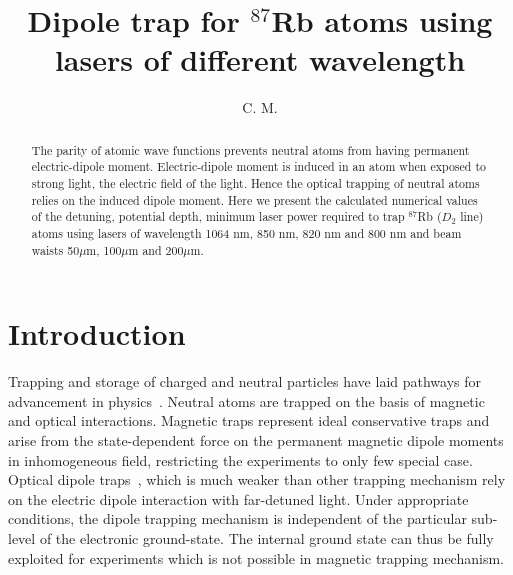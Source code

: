 \documentclass[amssymb,amsmath,aps,prl,twocolumn]{revtex4}
\begin{document}

\title{Dipole trap for $^{87}$Rb atoms using lasers of different wavelength}



\author{C. M. }%



\begin{abstract}

The parity of atomic wave functions prevents neutral atoms from having 
permanent electric-dipole moment. Electric-dipole moment is induced in an 
atom when exposed to strong light, the electric field of the light.
Hence the optical trapping of neutral atoms relies on the induced dipole 
moment. Here we present the calculated numerical values of the detuning, potential depth, minimum laser power required to trap $^{87}$Rb ($D_2$ line) atoms using lasers of wavelength 1064 nm, 850 nm, 820 nm and 800 nm and beam waists 50$\mu$m, 100$\mu$m and 200$\mu$m.

\end{abstract}

\maketitle


\section{Introduction}

Trapping and storage of charged and neutral particles have laid pathways
for advancement in physics~\cite{chu}. Neutral atoms are trapped on the basis 
of magnetic and optical interactions. Magnetic traps represent ideal conservative traps and arise from the state-dependent force on the permanent magnetic dipole moments in inhomogeneous field, restricting the experiments to only few special case. Optical dipole traps~\cite{grimm}, which is much weaker than other trapping mechanism rely on the electric dipole interaction with far-detuned light. Under appropriate conditions, the dipole trapping mechanism is independent of the particular sub-level of the electronic ground-state. The internal ground state can thus be fully exploited for experiments which is not possible in magnetic trapping mechanism.\\
\end{document}
